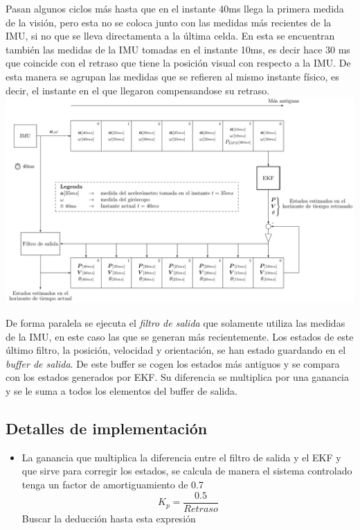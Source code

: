 Pasan algunos ciclos más hasta que en el instante 40ms llega la primera medida de la visión, pero esta no se coloca junto con las medidas más recientes de la IMU, si no que se lleva directamenta a la última celda. En esta se encuentran también las medidas de la IMU tomadas en el instante 10ms, es decir hace 30 ms que coincide con el retraso que tiene la posición visual con respecto a la IMU. De esta manera se agrupan las medidas que se refieren al mismo instante físico, es decir, el instante en el que llegaron compensandose su retraso. 
\\
\includegraphics[width=\textwidth]{estimador_px4/tikz/ekf_output}



De forma paralela se ejecuta el \textit{filtro de salida} que solamente utiliza las medidas de la IMU, en este caso las que se generan más recientemente.
Los estados de este último filtro, la posición, velocidad y orientación,  se han estado guardando en el \textit{buffer de salida}.  
De este buffer se cogen los estados más antiguos y se compara con los estados generados por EKF. Su diferencia se multiplica por una ganancia y se le suma a todos los elementos del buffer de salida.  

\subsection{Detalles de implementación}
\begin{itemize}
\item La ganancia que multiplica la diferencia entre el filtro de salida y el EKF y que sirve para corregir los estados, se calcula de manera el sistema controlado tenga un factor de amortiguamiento de 0.7
\begin{equation}
K_p=\frac{0.5}{Retraso}
\end{equation} 
{\color{red} Buscar la deducción hasta esta expresión}
\end{itemize}


